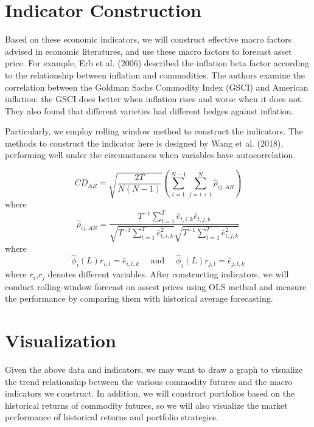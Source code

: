 \documentclass[11pt,en,cite=authoryear]{elegantpaper}
\begin{document}
\section{Indicator Construction}
Based on these economic indicators, we will construct effective macro factors advised in economic literatures, and use these macro factors to forecast asset price. For example, Erb et al. (2006) described the inflation beta factor according to the relationship between inflation and commodities. The authors examine the correlation between the Goldman Sachs Commodity Index (GSCI) and American inflation: the GSCI does better when inflation rises and worse when it does not. They also found that different varieties had different hedges against inflation.

Particularly, we employ rolling window method to construct the indicators.
The methods to construct the indicator here is designed by Wang et al. (2018), performing well under the circumstances when variables have autocorrelation. 

\begin{equation}
	C D_{A R}=\sqrt{\frac{2 T}{N(N-1)}}\left(\sum_{i=1}^{N-1} \sum_{j=i+1}^{N} \hat{\rho}_{i j, A R}\right)
\end{equation}
where
\begin{equation}
	\hat{\rho}_{ij, A R}=\frac{T^{-1} \sum_{t=1}^{T} \hat{e}_{t, i, k} \hat{e}_{t, j, k}}{\sqrt{T^{-1} \sum_{t=1}^{T} \hat{e}_{t, i, k}^{2}} \sqrt{T^{-1} \sum_{t=1}^{T} \hat{e}_{t, j, k}^{2}}}
\end{equation}
where
\begin{equation}
	\hat{\phi}_{i}(L) r_{i,t}=\hat{e}_{i, t, k} \quad \text { and } \quad \hat{\phi}_{j}(L) r_{j,t}=\hat{e}_{j,t, k}
\end{equation}
where $r_i$,$r_j$ denotes different variables.
After constructing indicators, we will conduct rolling-window forecast on assest prices using OLS method
and measure the performance by comparing them with historical average forecasting.

\section{Visualization}
Given the above data and indicators, we may want to draw a graph to visualize the trend relationship between the various commodity futures and the macro indicators we construct. In addition, we will construct portfolios based on the historical returns of commodity futures, so we will also visualize the market performance of historical returns and portfolio strategies.
\end{document}
